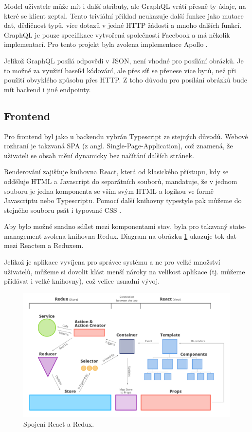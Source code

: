 Model uživatele může mít i další atributy, ale GraphQL vrátí přesně ty údaje, na které se klient zeptal.
Tento triviální příklad neukazuje další funkce jako mutace dat, dědičnost typů, více dotazů v jedné HTTP žádosti
a mnoho dalších funkcí.
GraphQL je pouze specifikace vytvořená společností Facebook a má několik
implementací. \citep[viz][]{GraphQLDoc} Pro tento projekt byla zvolena implementace Apollo \citep[viz][]{Apollo}.

Jelikož GraphQL posílá odpovědi v JSON, není vhodné pro posílání obrázků. Je to možné za využití base64 kódování,
ale přes síť se přenese více bytů, než při použití obvyklého způsobu přes HTTP. Z toho důvodu pro posílání
obrázků bude mít backend i jiné endpointy.

\subsection{Frontend} \label{frontend}

\noindent
Pro frontend byl jako u backendu vybrán Typescript ze stejných důvodů. Webové rozhraní
je takzvaná SPA (z angl. Single-Page-Application), což znamená, že uživateli se obsah mění dynamicky
bez načítání dalších stránek.

Renderování zajišťuje knihovna React, která od klasického přístupu, kdy se odděluje HTML a Javascript do separátních
souborů, mandatuje, že v jednom souboru je jedna komponenta se vším svým HTML a logikou ve formě Javascriptu nebo
Typescriptu. \citep[viz][]{Reactjs}
Pomocí další knihovny typestyle pak můžeme do stejného souboru psát i typované CSS \citep[viz][]{typestyle}.

Aby bylo možné snadno sdílet mezi komponentami stav, byla pro takzvaný state-management zvolena knihovna Redux.
\citep[viz][]{ReduxCore}
Diagram na obrázku \ref{fig:react_redux_dataflow} ukazuje tok dat mezi Reactem a Reduxem.

Jelikož je aplikace vyvíjena pro správce systému a ne pro velké množství uživatelů, můžeme si dovolit
klást menší nároky na velikost aplikace (tj. můžeme přidávat i velké knihovny), což velice usnadní vývoj.

\begin{figure}[!htb] \centering
\includegraphics[width=145mm]{../img/react-redux-architecture.png}
\caption{Spojení React a Redux. \citep[viz][]{react_redux_dataflow}}
\label{fig:react_redux_dataflow}
\end{figure}

